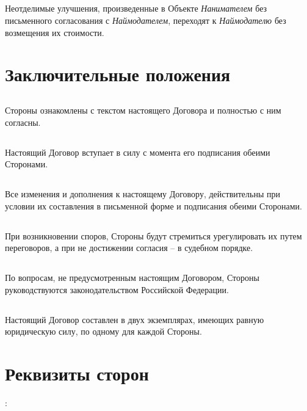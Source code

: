 \documentclass[a4paper, 11pt]{article}
\begin{document}
\subsection{} Неотделимые улучшения, произведенные в Объекте \textit{Нанимателем} без письменного
согласования с \textit{Наймодателем}, переходят к \textit{Наймодателю} без возмещения их
стоимости.

\section{Заключительные положения}
\subsection{} Стороны ознакомлены с текстом настоящего Договора и полностью с ним
согласны.
\subsection{} Настоящий Договор вступает в силу с момента его подписания обеими
Сторонами.
\subsection{} Все изменения и дополнения к настоящему Договору, действительны при условии
их составления в письменной форме и подписания обеими Сторонами.
\subsection{} При возникновении споров, Стороны будут стремиться урегулировать их путем
переговоров, а при не достижении согласия – в судебном порядке.
\subsection{} По вопросам, не предусмотренным настоящим Договором, Стороны
руководствуются законодательством Российской Федерации.
\subsection{} Настоящий Договор составлен в двух экземплярах, имеющих равную юридическую
силу, по одному для каждой Стороны.

\section{Реквизиты сторон}:
\end{document}
